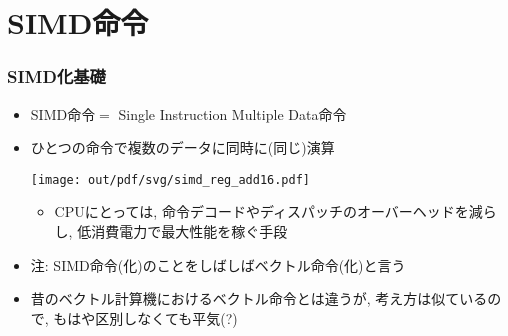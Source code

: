 \documentclass[10pt,dvipdfmx]{beamer}
\newcommand{\ao}[1]{{\color{blue}#1}}
\begin{document}
\iffalse
\subsection{ワークロード}
\begin{frame}[fragile]
\frametitle{想定ワークロード(1) --- 密行列積}
\begin{lstlisting}
for (i = 0; i < M; i++) {
 for (j = 0; j < N; j++) {
  real c = 0.0;
  for (k = 0; k < K; k++) {
   c += A(i,k) * B(k,j);
  }
  C(i,j) += c;
 }
}
\end{lstlisting}
\end{frame}

\begin{frame}[fragile]
\frametitle{想定ワークロード(2) --- $N$体問題}
\begin{lstlisting}
real interact_all(long n, particle * p) {
  for (i = 0; i < n; i++) {
    for (j = 0; j < n; j++) {
      if (i != j) {
        dx = p[j].pos - p[i].pos; // (x,y,z)のベクトル
        r = |dx|; // (x*x+y*y+z*z)^{1/2}
        p[i].acc += p[j].m * dx / (r * r * r);
      }
    }
  }
}
\end{lstlisting}
\end{frame}
\fi

\section{SIMD命令}

\begin{frame}
  \frametitle{SIMD化基礎}
  \begin{itemize}
  \item \ao{SIMD}命令$=$ \ao{S}ingle \ao{I}nstruction \ao{M}ultiple \ao{D}ata命令
  \item ひとつの命令で複数のデータに同時に(同じ)演算

    \begin{center}
    \texttt{[image: out/pdf/svg/simd\_reg\_add16.pdf]}
    \end{center}
    
    \begin{itemize}
    \item CPUにとっては, 命令デコードやディスパッチのオーバーヘッドを減らし,
      低消費電力で最大性能を稼ぐ手段
    \end{itemize}
  \item \ao{注:} SIMD命令(化)のことをしばしば\ao{ベクトル}命令(化)と言う
  \item 昔のベクトル計算機におけるベクトル命令とは違うが,
    考え方は似ているので, もはや区別しなくても平気(?)
  \end{itemize}
\end{frame}
\end{document}
